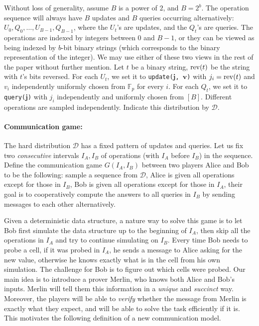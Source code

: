 \documentclass[11pt]{article}
\begin{document}
Without loss of generality, assume $B$ is a power of $2$, and $B=2^b$. The operation sequence will always have $B$ updates and $B$ queries occurring alternatively: $U_0,Q_0,\ldots, U_{B-1},Q_{B-1}$, where the $U_t$'s are updates, and the $Q_t$'s are queries. The operations are indexed by integers between $0$ and $B-1$, or they can be viewed as being indexed by $b$-bit binary strings (which corresponds to the binary representation of the integer). We may use either of these two views in the rest of the paper without further mention. Let $t$ be a binary string, $\mathrm{rev}(t)$ be the string with $t$'s bits reversed. For each $U_t$, we set it to \verb+update(+$\mathbf{j}$\verb+, +$\mathbf{v}$\verb+)+ with $j_i=\mathrm{rev}(t)$ and $v_i$ independently uniformly chosen from $\mathbb{F}_p$ for every $i$. For each $Q_t$, we set it to \verb+query(+$\mathbf{j}$\verb+)+ with $j_i$ independently and uniformly chosen from $[B]$. Different operations are sampled independently. Indicate this distribution by $\mathcal{D}$. 

\paragraph*{Communication game:}

The hard distribution $\mathcal{D}$ has a fixed pattern of updates and queries. Let us fix two \emph{consecutive} intervals $I_A, I_B$ of operations (with $I_A$ before $I_B$) in the sequence. Define the communication game $G(I_A,I_B)$ between two players Alice and Bob to be the following: sample a sequence from $\mathcal{D}$, Alice is given all operations except for those in $I_B$, Bob is given all operations except for those in $I_A$, their goal is to cooperatively compute the answers to all queries in $I_B$ by sending messages to each other alternatively.

Given a deterministic \bps{} data structure, a nature way to solve this game is to let Bob first simulate the data structure up to the beginning of $I_A$, then skip all the operations in $I_A$ and try to continue simulating on $I_B$. Every time Bob needs to probe a cell, if it was probed in $I_A$, he sends a message to Alice asking for the new value, otherwise he knows exactly what is in the cell from his own simulation. The challenge for Bob is to figure out which cells were probed. Our main idea is to introduce a prover Merlin, who knows both Alice and Bob's inputs. Merlin will tell them this information in a \emph{unique} and \emph{succinct} way. Moreover, the players will be able to \emph{verify} whether the message from Merlin is exactly what they expect, and will be able to solve the task efficiently if it is. This motivates the following definition of a new communication model.
\end{document}
